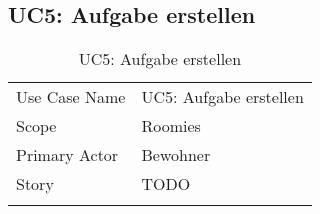 \subsection{UC5: Aufgabe erstellen}
\begin{table}[H]
	\tablestyle
	\tablealtcolored
	\begin{tabularx}{\textwidth}{lX}
		\tablebody
			Use Case Name &
			UC5: Aufgabe erstellen
			\tabularnewline
			Scope &
			Roomies
			\tabularnewline
			Primary Actor &
			Bewohner
			\tabularnewline
			Story &
			TODO
			\tabularnewline
		\tableend
	\end{tabularx}
	\caption{UC5: Aufgabe erstellen}
\end{table}


